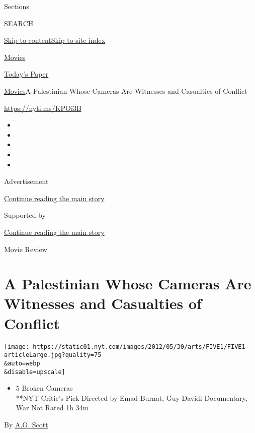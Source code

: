 Sections

SEARCH

\protect\hyperlink{site-content}{Skip to
content}\protect\hyperlink{site-index}{Skip to site index}

\href{https://www.nytimes.com/section/movies}{Movies}

\href{https://myaccount.nytimes.com/auth/login?response_type=cookie\&client_id=vi}{}

\href{https://www.nytimes.com/section/todayspaper}{Today's Paper}

\href{/section/movies}{Movies}\textbar{}A Palestinian Whose Cameras Are
Witnesses and Casualties of Conflict

\href{https://nyti.ms/KPOi3B}{https://nyti.ms/KPOi3B}

\begin{itemize}
\item
\item
\item
\item
\item
\end{itemize}

Advertisement

\protect\hyperlink{after-top}{Continue reading the main story}

Supported by

\protect\hyperlink{after-sponsor}{Continue reading the main story}

Movie Review

\hypertarget{a-palestinian-whose-cameras-are-witnesses-and-casualties-of-conflict}{%
\section{A Palestinian Whose Cameras Are Witnesses and Casualties of
Conflict}\label{a-palestinian-whose-cameras-are-witnesses-and-casualties-of-conflict}}

\texttt{[image: https://static01.nyt.com/images/2012/05/30/arts/FIVE1/FIVE1-articleLarge.jpg?quality=75\\\&auto=webp\\\&disable=upscale]}

\begin{itemize}
\tightlist
\item
  5 Broken Cameras\\
  **NYT Critic's Pick Directed by Emad Burnat, Guy Davidi Documentary,
  War Not Rated 1h 34m
\end{itemize}

By \href{https://www.nytimes.com/by/a-o--scott}{A.O. Scott}

